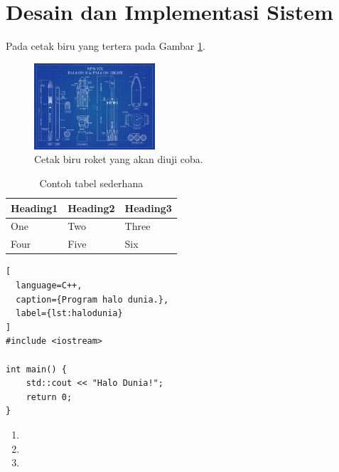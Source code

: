 \section{Desain dan Implementasi Sistem}
\label{sec:desainimplementasi}


Pada cetak biru yang tertera pada Gambar \ref{fig:cetakbiru}. \lipsum[8]

\begin{figure} [ht]
  \centering
  \includegraphics[width=0.4\textwidth]{gambar/cetakbiru.jpg}
  \caption{Cetak biru roket yang akan diuji coba. \cite{cetakbiruspacex}}
  \label{fig:cetakbiru}
\end{figure}

\lipsum[9-10]

\begin{table}
  \caption{Contoh tabel sederhana}
  \label{tab:tabelsederhana}
  \centering
  \begin{tabular}{lll}
    \toprule
    Heading1 & Heading2 & Heading3  \\
    \midrule
    One      & Two      & Three     \\
    Four     & Five     & Six       \\
    \bottomrule
  \end{tabular}
\end{table}

\begin{lstlisting}[
  language=C++,
  caption={Program halo dunia.},
  label={lst:halodunia}
]
#include <iostream>

int main() {
    std::cout << "Halo Dunia!";
    return 0;
}
\end{lstlisting}

\lipsum[11-12]

\begin{enumerate}
  \item \lipsum[13][1-4]
  \item \lipsum[13][5-8]
  \item \lipsum[13][9-12]
\end{enumerate}

\lipsum[14-15]
